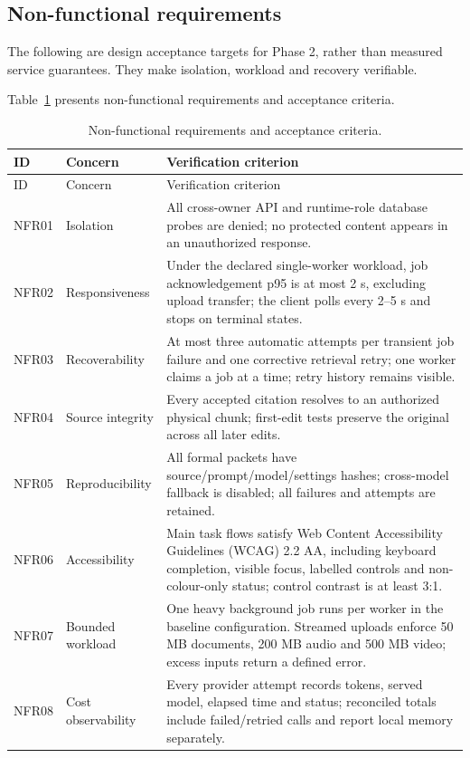 \subsection{Non-functional requirements}
The following are design acceptance targets for Phase 2, rather than measured service guarantees. They make isolation, workload and recovery verifiable.
\par
Table~\ref{tab:nfr} presents non-functional requirements and acceptance criteria.
\begin{longtable}{|p{1.6cm}|p{4.0cm}|p{8.3cm}|}\caption{Non-functional requirements and acceptance criteria.}\label{tab:nfr}\\\hline
ID & Concern & Verification criterion\\\hline\endfirsthead
\hline ID & Concern & Verification criterion\\\hline\endhead
NFR01 & Isolation & All cross-owner API and runtime-role database probes are denied; no protected content appears in an unauthorized response.\\\hline
NFR02 & Responsiveness & Under the declared single-worker workload, job acknowledgement p95 is at most 2 s, excluding upload transfer; the client polls every 2--5 s and stops on terminal states.\\\hline
NFR03 & Recoverability & At most three automatic attempts per transient job failure and one corrective retrieval retry; one worker claims a job at a time; retry history remains visible.\\\hline
NFR04 & Source integrity & Every accepted citation resolves to an authorized physical chunk; first-edit tests preserve the original across all later edits.\\\hline
NFR05 & Reproducibility & All formal packets have source/prompt/model/settings hashes; cross-model fallback is disabled; all failures and attempts are retained.\\\hline
NFR06 & Accessibility & Main task flows satisfy Web Content Accessibility Guidelines (WCAG) 2.2 AA, including keyboard completion, visible focus, labelled controls and non-colour-only status; control contrast is at least 3:1.\\\hline
NFR07 & Bounded workload & One heavy background job runs per worker in the baseline configuration. Streamed uploads enforce 50 MB documents, 200 MB audio and 500 MB video; excess inputs return a defined error.\\\hline
NFR08 & Cost observability & Every provider attempt records tokens, served model, elapsed time and status; reconciled totals include failed/retried calls and report local memory separately.\\\hline
\end{longtable}
\needspace{.60\textheight}
